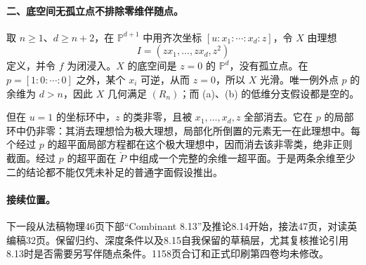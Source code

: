\documentclass[openany,fontset=fandol]{ctexbook}
\newcommand{\PD}{\check P}
\begin{document}
\paragraph{二、底空间无孤立点不排除零维伴随点。}
取 $n\ge1$、$d\ge n+2$，在 $\mathbb P^{d+1}$ 中用齐次坐标 $[u:x_1:\cdots:x_d:z]$，令 $X$ 由理想
\[
 I=(zx_1,\ldots,zx_d,z^2)
\]
定义，并令 $f$ 为闭浸入。$X$ 的底空间是 $z=0$ 的 $\mathbb P^d$，没有孤立点。在 $p=[1:0:\cdots:0]$ 之外，某个 $x_i$ 可逆，从而 $z=0$，所以 $X$ 光滑。唯一例外点 $p$ 的余维为 $d>n$，因此 $X$ 几何满足 $(R_n)$；而 (a)、(b) 的低维分支假设都是空的。

但在 $u=1$ 的坐标环中，$z$ 的类非零，且被 $x_1,\ldots,x_d,z$ 全部消去。它在 $p$ 的局部环中仍非零：其消去理想恰为极大理想，局部化所倒置的元素无一在此理想中。每个经过 $p$ 的超平面局部方程都在这个极大理想中，因而消去该非零类，绝非正则截面。经过 $p$ 的超平面在 $\PD$ 中组成一个完整的余维一超平面。于是两条余维至少二的结论都不能仅凭未补足的普通字面假设推出。

\paragraph{接续位置。}
下一段从法稿物理46页下部“Combinant 8.13”及推论8.14开始，接法47页，对读英编稿32页。保留归约、深度条件以及8.15自我保留的草稿层，尤其复核推论引用8.13时是否需要另写伴随点条件。1158页合订和正式印刷第四卷均未修改。
\end{document}

